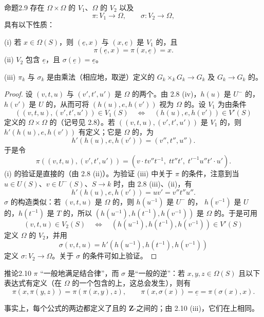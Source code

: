 \begin{SGAresult}{命题}{2.9}
存在 $\Omega\times\Omega$ 的 $V_1$、$\Omega$ 的 $V_2$ 以及
\[\pi:V_1\longrightarrow\Omega,\qquad\sigma:V_2\longrightarrow\Omega,\]
具有以下性质：

(i) 若 $x\in\Omega(S)$，则 $(\underline e,x)$ 与 $(x,\underline e)$ 是 $V_1$ 的，且
\[\pi(\underline e,x)=\pi(x,\underline e)=x.\]
(ii) $V_2$ 包含 $\underline e$，且 $\sigma(\underline e)=\underline e$。

(iii) $\pi_k$ 与 $\sigma_k$ 是由乘法（相应地，取逆）定义的 $G_k\times_kG_k\to G_k$ 及 $G_k\to G_k$ 的。
\end{SGAresult}
\begin{proof}
设 $(v,t,u)$ 与 $(v',t',u')$ 是 $\Omega$ 的两个。由 2.8 (iv)，$h(u)$ 是 $U^-$ 的，$h(v')$ 是 $U$ 的，从而可将 $(h(u),e,h(v'))$ 视为 $\Omega$ 的。设 $V_1$ 为由条件
\[((v,t,u),(v',t',u'))\in V_1(S)\quad\Longleftrightarrow\quad(h(u),e,h(v'))\in V'(S)\]
定义的 $\Omega\times\Omega$ 的（记号见 2.8）。若 $((v,t,u),(v',t',u'))$ 是 $V_1$ 的，则 $h'(h(u),e,h(v'))$ 有定义；它是 $\Omega$ 的，为
\[h'(h(u),e,h(v'))=(v'',t'',u'').\]
于是令
\[\pi((v,t,u),(v',t',u'))=(v\cdot tv''t^{-1},\;tt''t',\;t'^{-1}u''t'\cdot u').\]
(i) 的验证是直接的（由 2.8 (ii)）。为验证 (iii) 中关于 $\pi$ 的条件，注意到当 $u\in U(S)$、$v\in U^-(S)$、$S\to k$ 时，由 2.8 (iii)、(ii)，有
\[h'(h(u),e,h(v'))=uv'=v''t''u''.\]
$\sigma$ 的构造类似：若 $(v,t,u)$ 是 $\Omega$ 的，则 $h(u^{-1})$ 是 $U^-$ 的，
$h(v^{-1})$ 是 $U$ 的，$h(t^{-1})$ 是 $T$ 的，所以 $(h(u^{-1}),h(t^{-1}),h(v^{-1}))$ 是 $\Omega$ 的。于是可用
\[(v,t,u)\in V_2(S)\quad\Longleftrightarrow\quad(h(u^{-1}),h(t^{-1}),h(v^{-1}))\in V'(S)\]
定义 $\Omega$ 的 $V_2$，并用
\[\sigma(v,t,u)=h'(h(u^{-1}),h(t^{-1}),h(v^{-1}))\]
定义 $\sigma:V_2\to\Omega$。关于 $\sigma$ 的条件可如上验证。
\end{proof}

\begin{SGAresult}{推论}{2.10}
$\pi$ “一般地满足结合律”，而 $\sigma$ 是“一般的逆”：若 $x,y,z\in\Omega(S)$ 且以下表达式有定义（在 $\Omega$ 的一个包含的上，这总会发生），则有
\[\pi(x,\pi(y,z))=\pi(\pi(x,y),z),\qquad\pi(x,\sigma(x))=\underline e=\pi(\sigma(x),x).\]
\end{SGAresult}
事实上，每个公式的两边都定义了且的 $\mathbf Z$-之间的；由 2.10 (iii)，它们在上相同。

